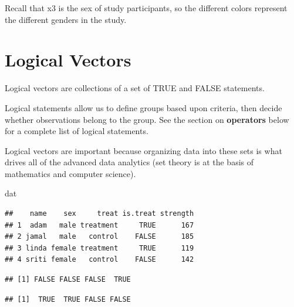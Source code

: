 \documentclass[]{book}
\newenvironment{Shaded}{\begin{snugshade}}{\end{snugshade}}
\newcommand{\NormalTok}[1]{#1}
\newcommand{\OperatorTok}[1]{\textcolor[rgb]{0.81,0.36,0.00}{\textbf{#1}}}
\newcommand{\StringTok}[1]{\textcolor[rgb]{0.31,0.60,0.02}{#1}}
\theoremstyle{definition}
\theoremstyle{definition}
\theoremstyle{definition}
\theoremstyle{remark}
\begin{document}
Recall that x3 is the sex of study participants, so the different colors
represent the different genders in the study.

\hypertarget{logical-vectors}{%
\section{Logical Vectors}\label{logical-vectors}}

Logical vectors are collections of a set of TRUE and FALSE statements.

Logical statements allow us to define groups based upon criteria, then
decide whether observations belong to the group. See the section on
\textbf{operators} below for a complete list of logical statements.

Logical vectors are important because organizing data into these sets is
what drives all of the advanced data analytics (set theory is at the
basis of mathematics and computer science).

\begin{Shaded}
\begin{Highlighting}[]
\NormalTok{dat}
\end{Highlighting}
\end{Shaded}

\begin{verbatim}
##    name    sex     treat is.treat strength
## 1  adam   male treatment     TRUE      167
## 2 jamal   male   control    FALSE      185
## 3 linda female treatment     TRUE      119
## 4 sriti female   control    FALSE      142
\end{verbatim}

\begin{Shaded}
\end{Shaded}

\begin{verbatim}
## [1] FALSE FALSE FALSE  TRUE
\end{verbatim}

\begin{Shaded}
\end{Shaded}

\begin{verbatim}
## [1]  TRUE  TRUE FALSE FALSE
\end{verbatim}
\end{document}
